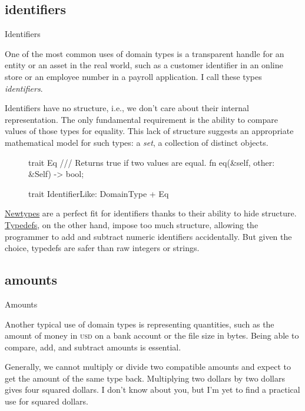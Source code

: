 \documentclass{article}
\begin{document}
\subsection{identifiers}{Identifiers}

One of the most common uses of domain types is a transparent handle for an entity or an asset in the real world, such as a customer identifier in an online store or an employee number in a payroll application.
I call these types \emph{identifiers}.

Identifiers have no structure, i.e., we don't care about their internal representation.
The only fundamental requirement is the ability to compare values of those types for equality.
This lack of structure suggests an appropriate mathematical model for such types: a \emph{set}, a collection of distinct objects.

\begin{figure}
\begin{code}[rust]
trait Eq {
  /// Returns true if two values are equal.
  fn eq(&self, other: &Self) -> bool;
}

trait IdentifierLike: DomainType + Eq {}
\end{code}
\end{figure}

\href{#newtypes}{Newtypes} are a perfect fit for identifiers thanks to their ability to hide structure.
\href{#typdefs}{Typedefs}, on the other hand, impose too much structure, allowing the programmer to add and subtract numeric identifiers accidentally.
But given the choice, typedefs are safer than raw integers or strings.

\subsection{amounts}{Amounts}

Another typical use of domain types is representing quantities, such as the amount of money in \textsc{usd} on a bank account or the file size in bytes.
Being able to compare, add, and subtract amounts is essential.

Generally, we cannot multiply or divide two compatible amounts and expect to get the amount of the same type back.
Multiplying two dollars by two dollars gives four squared dollars.
I don't know about you, but I'm yet to find a practical use for squared dollars.
\end{document}
